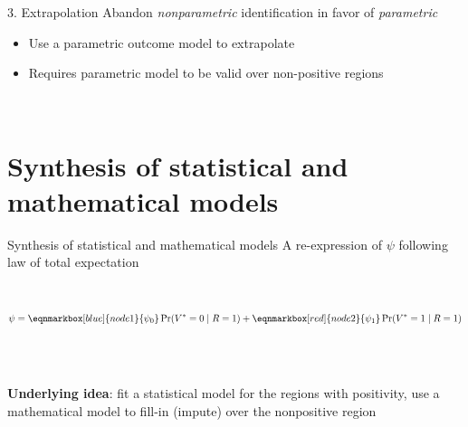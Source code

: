 \documentclass{beamer}
\begin{document}
\begin{frame}{3. Extrapolation}
	Abandon \textit{nonparametric} identification in favor of \textit{parametric}
	\begin{itemize}
		\item Use a parametric outcome model to extrapolate
		\item Requires parametric model to be valid over non-positive regions
	\end{itemize}
	~\\
\end{frame}

\section{Synthesis of statistical and mathematical models}

\begin{frame}{Synthesis of statistical and mathematical models}
	A re-expression of $\psi$ following law of total expectation\\~\\~\\
	\begin{equation*}
		\psi = 
		\eqnmarkbox[blue]{node1}{\psi_0}
		\Pr(V^{*}=0 \mid R=1)
		+ 
		\eqnmarkbox[red]{node2}{\psi_1}
		\Pr(V^{*}=1 \mid R=1)
	\end{equation*}
	~\\~\\~\\
	\textbf{Underlying idea}: fit a statistical model for {\color{blue} the regions with positivity}, use a mathematical model to fill-in (impute) over {\color{red} the nonpositive region}
\end{frame}
\end{document}
